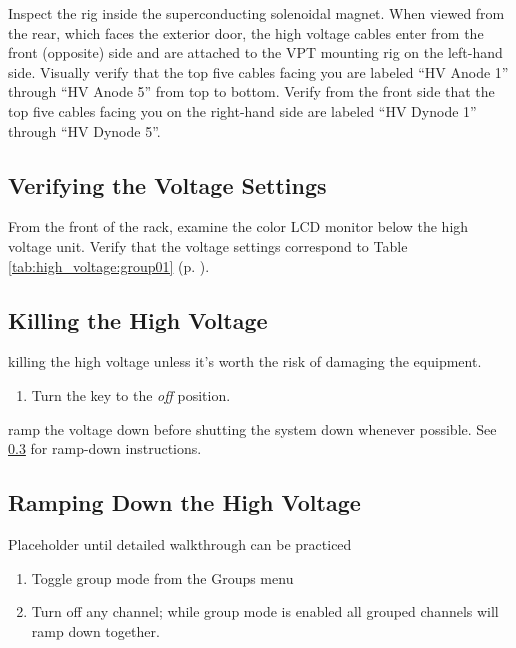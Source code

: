 Inspect the rig inside the superconducting solenoidal magnet.  When viewed from the rear, which faces the exterior door, the high voltage cables enter from the front (opposite) side and are attached to the VPT mounting rig on the left-hand side.  Visually verify that the top five cables facing you are labeled ``HV Anode 1'' through ``HV Anode 5'' from top to bottom.  Verify from the front side that the top five cables facing you on the right-hand side are labeled ``HV Dynode 1'' through ``HV Dynode 5''.

\subsection{Verifying the Voltage Settings}
\label{sec:op_high_voltage:verify_voltage}

From the front of the rack, examine the color LCD monitor below the high voltage unit.  Verify that the voltage settings correspond to Table \ref{tab:high_voltage:group01} (p. \pageref{tab:high_voltage:group01}).

\subsection{Killing the High Voltage}
\label{sec:op_high_voltage:kill}

\begin{avoid} killing the high voltage unless it's worth the risk of damaging the equipment.\end{avoid}

\begin{enumerate}
\item Turn the key to the \textit{off} position.
\end{enumerate}

\begin{pleasedo} ramp the voltage down before shutting the system down whenever possible.  See \ref{sec:op_high_voltage:rampdown} for ramp-down instructions.\end{pleasedo}

\subsection{Ramping Down the High Voltage}
\label{sec:op_high_voltage:rampdown}

\FIXME{} Placeholder until detailed walkthrough can be practiced

\begin{enumerate}
\item Toggle group mode from the Groups menu
\item Turn off any channel; while group mode is enabled all grouped channels will ramp down together.
\end{enumerate}

